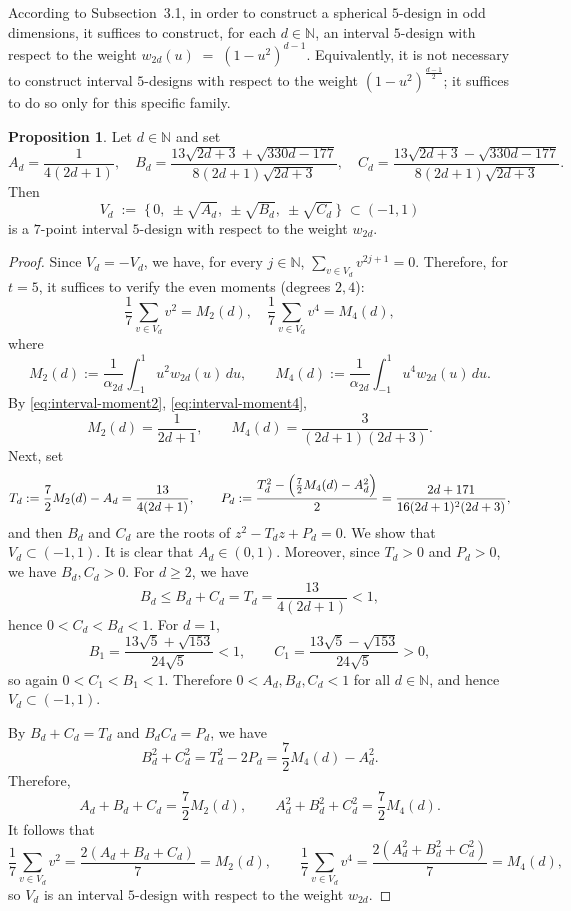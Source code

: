 \documentclass{amsart}
\theoremstyle{definition}
\newtheorem{proposition}[theorem]{Proposition}
\theoremstyle{remark}
\numberwithin{equation}{section}
\newcommand{\N}{{\mathbb N}}
\begin{document}
According to Subsection~3.1, in order to construct a spherical $5$-design in odd dimensions, it suffices to construct, for each $d\in\N$,
an interval $5$-design with respect to the weight
\(
  w_{2d}(u) \;=\; (1-u^2)^{d-1}.
\)
Equivalently, it is not necessary to construct interval $5$-designs with respect to the weight $(1-u^2)^{\frac{d-1}{2}}$;
it suffices to do so only for this specific family.

\begin{proposition}
\label{prop:Vd_interval5-design}
Let $d\in\N$ and set
\[
A_d= \frac{1}{4(2d+1)}, \quad
B_d=\frac{13\sqrt{2d+3}+\sqrt{330d-177}}{8(2d+1)\sqrt{2d+3}},\quad
C_d=\frac{13\sqrt{2d+3}-\sqrt{330d-177}}{8(2d+1)\sqrt{2d+3}}.
\]
Then
\[
  V_d
  \;:=\;
  \bigl\{\, 0,\ \pm\sqrt{A_d},\ \pm\sqrt{B_d},\ \pm\sqrt{C_d}\, \bigr\}
  \;\subset (-1, 1)
\]
is a $7$-point interval $5$-design with respect to the weight $w_{2d}$.
\end{proposition}

\begin{proof}
Since $V_d=-V_d$, we have, for every $j\in\N$,
\(
\sum_{v\in V_d} v^{2j+1}=0.
\)
Therefore, for $t=5$, it suffices to verify the even moments (degrees $2,4$):
\[
\frac17\sum_{v\in V_d}v^2= M_2(d),
\quad
\frac17\sum_{v\in V_d}v^4= M_4(d),
\]
where
\[
M_2(d):=\frac{1}{\alpha_{2d}}\int_{-1}^1 u^2 w_{2d}(u)\,du,
\qquad
M_4(d):=\frac{1}{\alpha_{2d}}\int_{-1}^1 u^4 w_{2d}(u)\,du.
\]
By \eqref{eq:interval-moment2}, \eqref{eq:interval-moment4},
\[
M_2(d)=\frac{1}{2d+1},
\qquad
M_4(d)=\frac{3}{(2d+1)(2d+3)}.
\]
Next, set
\[
T_d:=\frac{7}{2}M_2(d)-A_d=\frac{13}{4(2d+1)},
\qquad
P_d:=\frac{T_d^2-\Bigl(\frac{7}{2}M_4(d)-A_d^2\Bigr)}{2}
      =\frac{2d+171}{16(2d+1)^2(2d+3)},
\]
and then $B_d$ and $C_d$ are the roots of $z^2-T_dz+P_d=0$. We show that $V_d\subset(-1,1)$.
It is clear that $A_d\in(0,1)$. Moreover, since $T_d>0$ and $P_d>0$, we have $B_d,C_d>0$.
For $d\ge2$, we have
\[
B_d\le B_d+C_d=T_d=\frac{13}{4(2d+1)}<1,
\]
hence $0<C_d<B_d<1$. For $d=1$,
\[
B_1=\frac{13\sqrt5+\sqrt{153}}{24\sqrt5}<1,
\qquad
C_1=\frac{13\sqrt5-\sqrt{153}}{24\sqrt5}>0,
\]
so again $0<C_1<B_1<1$.
Therefore $0<A_d,B_d,C_d<1$ for all $d\in\N$, and hence $V_d\subset(-1,1)$.

By $B_d+C_d=T_d$ and $B_dC_d=P_d$, we have
\[
B_d^2+C_d^2=T_d^2-2P_d=\frac{7}{2}M_4(d)-A_d^2.
\]
Therefore,
\[
A_d+B_d+C_d=\frac{7}{2}M_2(d),\qquad
A_d^2+B_d^2+C_d^2=\frac{7}{2}M_4(d).
\]
It follows that
\[
\frac17\sum_{v\in V_d} v^2=\frac{2(A_d+B_d+C_d)}{7}=M_2(d),\qquad
\frac17\sum_{v\in V_d} v^4=\frac{2(A_d^2+B_d^2+C_d^2)}{7}=M_4(d),
\]
so $V_d$ is an interval $5$-design with respect to the weight $w_{2d}$.
\end{proof}
\end{document}
